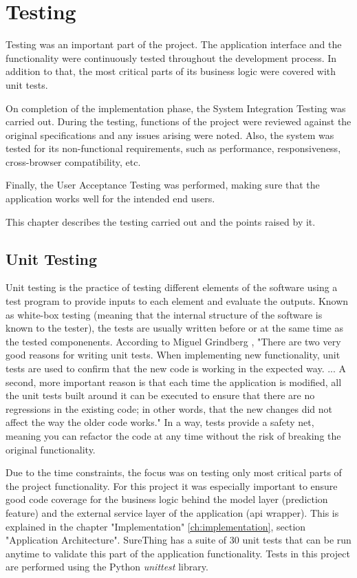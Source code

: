 \chapter{Testing}
\label{ch:testing}
Testing was an important part of the project. The application interface and the functionality were continuously tested throughout the development process. In addition to that, the most critical parts of its business logic were covered with unit tests.

On completion of the implementation phase, the System Integration Testing was carried out. During the testing, functions of the project were reviewed against the original specifications and any issues arising were noted. Also, the system was tested for its non-functional requirements, such as performance, responsiveness, cross-browser compatibility, etc.

Finally, the User Acceptance Testing was performed, making sure that the application works well for the intended end users. 

This chapter describes the testing carried out and the points raised by it.

\section{Unit Testing}
\label{sec:unittesting_test}
Unit testing is the practice of testing different elements of the software using a test program to provide inputs to each element and evaluate the outputs.
Known as white-box testing (meaning that the internal structure of the software is known to the tester), the tests are usually written before or at the same time as the tested componenents. According to Miguel Grindberg \citep{book:Grindberg2014FlaskWebDevelopment}, "There are two very good reasons for writing unit tests. When implementing new functionality, unit tests are used to confirm that the new code is working in the expected way. ... A second, more important reason is that each time the application is modified, all the unit tests built around it can be executed to ensure that there are no regressions  in the existing code; in other words, that the new changes did not affect the way the older code works." In a way, tests provide a safety net, meaning you can refactor the code at any time without the risk of breaking the original functionality.

Due to the time constraints, the focus was on testing only most critical parts of the project functionality. For this project it was especially important to ensure good code coverage for the business logic behind the model layer (prediction feature) and the external service layer of the application (api wrapper). This is explained in the chapter "Implementation" \ref{ch:implementation}, section "Application Architecture". SureThing has a suite of 30 unit tests that can be run anytime to validate this part of the application functionality. Tests in this project are performed using the Python \emph{unittest} library.

